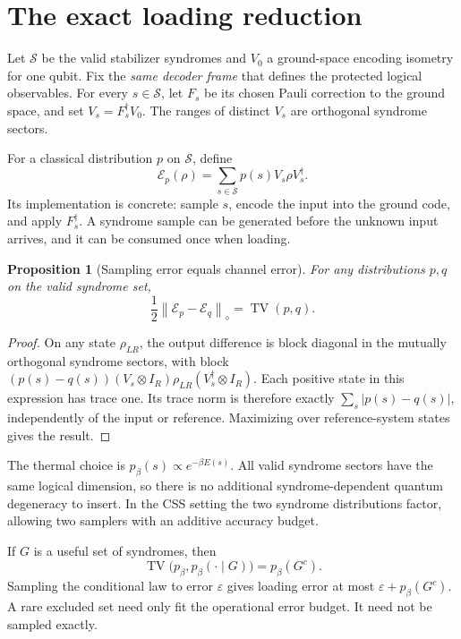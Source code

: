 \documentclass[11pt,a4paper]{article}
\newtheorem{proposition}{Proposition}
\newcommand{\TV}{\operatorname{TV}}
\newcommand{\Enc}{\mathcal E}
\newcommand{\norm}[1]{\left\lVert#1\right\rVert}
\begin{document}
\section{The exact loading reduction}

Let $\mathcal S$ be the valid stabilizer syndromes and $V_0$ a ground-space encoding isometry for one qubit. Fix the \emph{same decoder frame} that defines the protected logical observables. For every $s\in\mathcal S$, let $F_s$ be its chosen Pauli correction to the ground space, and set $V_s=F_s^\dagger V_0$. The ranges of distinct $V_s$ are orthogonal syndrome sectors.

For a classical distribution $p$ on $\mathcal S$, define
\begin{equation}\label{eq:loader}
 \Enc_p(\rho)=\sum_{s\in\mathcal S}p(s)V_s\rho V_s^\dagger.
\end{equation}
Its implementation is concrete: sample $s$, encode the input into the ground code, and apply $F_s^\dagger$. A syndrome sample can be generated before the unknown input arrives, and it can be consumed once when loading.

\begin{proposition}[Sampling error equals channel error]\label{prop:tv}
For any distributions $p,q$ on the valid syndrome set,
\begin{equation}\label{eq:tvdiamond}
 \boxed{\quad\frac12\norm{\Enc_p-\Enc_q}_\diamond=\TV(p,q).\quad}
\end{equation}
\end{proposition}
\begin{proof}
On any state $\rho_{LR}$, the output difference is block diagonal in the mutually orthogonal syndrome sectors, with block
$(p(s)-q(s))(V_s\otimes I_R)\rho_{LR}(V_s^\dagger\otimes I_R)$.
Each positive state in this expression has trace one. Its trace norm is therefore exactly $\sum_s|p(s)-q(s)|$, independently of the input or reference. Maximizing over reference-system states gives the result.
\end{proof}

The thermal choice is $p_\beta(s)\propto e^{-\beta E(s)}$. All valid syndrome sectors have the same logical dimension, so there is no additional syndrome-dependent quantum degeneracy to insert. In the CSS setting the two syndrome distributions factor, allowing two samplers with an additive accuracy budget.

If $G$ is a useful set of syndromes, then
\begin{equation}
 \TV\bigl(p_\beta,p_\beta(\cdot\mid G)\bigr)=p_\beta(G^c).
\end{equation}
Sampling the conditional law to error $\varepsilon$ gives loading error at most $\varepsilon+p_\beta(G^c)$. A rare excluded set need only fit the operational error budget. It need not be sampled exactly.
\end{document}
